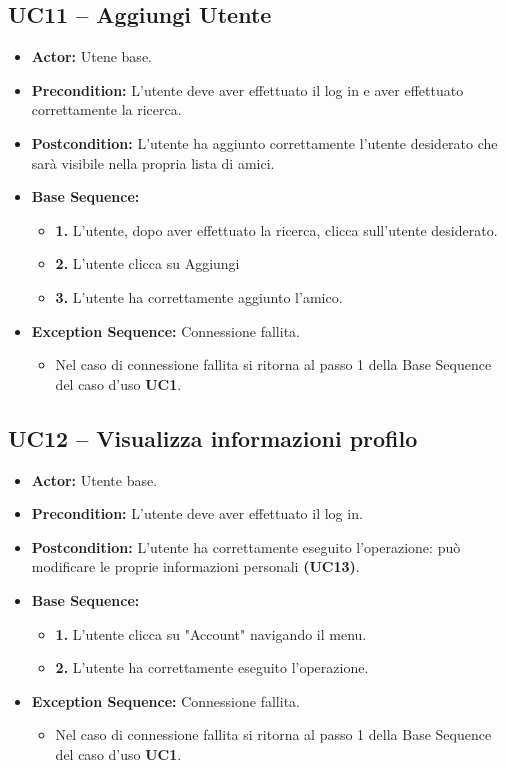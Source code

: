 \subsection{UC11 -- Aggiungi Utente}
\begin{itemize}
    \item \textbf{Actor:} Utene base.
    \item \textbf{Precondition:} L'utente deve aver effettuato il log in e aver effettuato correttamente la ricerca.
    \item \textbf{Postcondition:} L'utente ha aggiunto correttamente l'utente desiderato che sarà visibile nella propria lista di amici.
    \item \textbf{Base Sequence:}
    \begin{itemize}
        \item \textbf{1.} L'utente, dopo aver effettuato la ricerca, clicca sull'utente desiderato.
        \item \textbf{2.} L'utente clicca su Aggiungi
        \item \textbf{3.} L'utente ha correttamente aggiunto l'amico.
    \end{itemize}
    \item \textbf{Exception Sequence:} Connessione fallita.
    \begin{itemize}
        \item Nel caso di connessione fallita si ritorna al passo 1 della Base Sequence del caso d'uso \textbf{UC1}.
    \end{itemize}
\end{itemize}
\vspace{1cm}

\subsection{UC12 -- Visualizza informazioni profilo}
\begin{itemize}
    \item \textbf{Actor:} Utente base.
    \item \textbf{Precondition:} L'utente deve aver effettuato il log in.
    \item \textbf{Postcondition:} L'utente ha correttamente eseguito l'operazione: può modificare le proprie informazioni personali \textbf{(UC13)}.
    \item \textbf{Base Sequence:}
    \begin{itemize}
        \item \textbf{1.} L'utente clicca su "Account" navigando il menu.
        \item \textbf{2.} L'utente ha correttamente eseguito l'operazione.
    \end{itemize}
    
    \item \textbf{Exception Sequence:} Connessione fallita.
    \begin{itemize}
        \item Nel caso di connessione fallita si ritorna al passo 1 della Base Sequence del caso d'uso \textbf{UC1}.
    \end{itemize}
\end{itemize}
\vspace{1cm}

